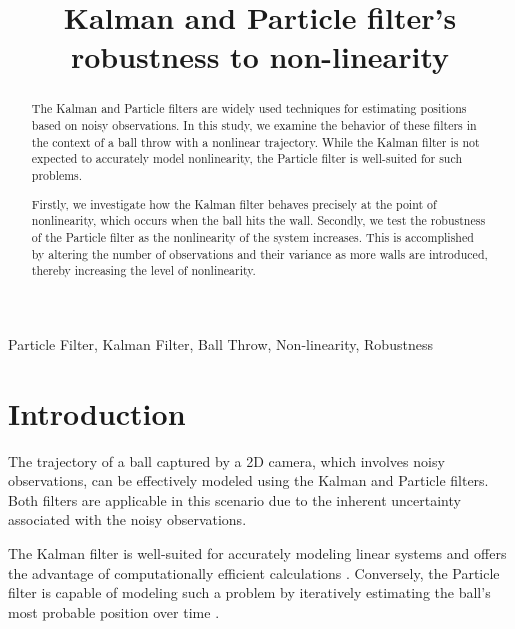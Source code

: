 \documentclass[conference]{IEEEtran}
\begin{document}
\title{Kalman and Particle filter's robustness to non-linearity}

\author{
}
\maketitle

\begin{abstract}

The Kalman and Particle filters are widely used techniques for estimating positions based on noisy observations.
In this study, we examine the behavior of these filters in the context of a ball throw with a nonlinear trajectory.
While the Kalman filter is not expected to accurately model nonlinearity, the Particle filter is well-suited for such problems.

Firstly, we investigate how the Kalman filter behaves precisely at the point of nonlinearity, which occurs when the ball hits the wall.
Secondly, we test the robustness of the Particle filter as the nonlinearity of the system increases. 
	This is accomplished by altering the number of observations and their variance as more walls are introduced, thereby increasing the level of nonlinearity.

\end{abstract}

\begin{IEEEkeywords}
Particle Filter, Kalman Filter, Ball Throw, Non-linearity, Robustness
\end{IEEEkeywords}

\section{Introduction}
The trajectory of a ball captured by a 2D camera, which involves noisy observations, can be effectively modeled using the Kalman and Particle filters.
Both filters are applicable in this scenario due to the inherent uncertainty associated with the noisy observations.

The Kalman filter is well-suited for accurately modeling linear systems and offers the advantage of computationally efficient calculations \cite{b6}.
Conversely, the Particle filter is capable of modeling such a problem by iteratively estimating the ball's most probable position over time \cite{b3}.
\end{document}
